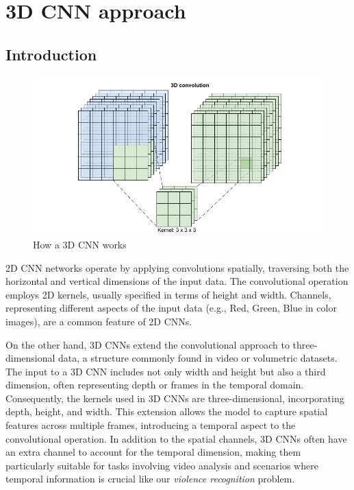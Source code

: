 \chapter{3D CNN approach}
\section{Introduction}
\begin{figure}[h]
    \centering
    \includegraphics[width=\textwidth]{./images/3DCNN.png}
    \caption{How a 3D CNN works}
    \label{fig:How3DCNNWorks}
\end{figure}

2D CNN networks operate by applying convolutions spatially, traversing both the horizontal and vertical dimensions of the input data. The convolutional operation employs 2D kernels, usually specified in terms of height and width. Channels, representing different aspects of the input data (e.g., Red, Green, Blue in color images), are a common feature of 2D CNNs.

On the other hand, 3D CNNs extend the convolutional approach to three-dimensional data, a structure commonly found in video or volumetric datasets. The input to a 3D CNN includes not only width and height but also a third dimension, often representing depth or frames in the temporal domain. Consequently, the kernels used in 3D CNNs are three-dimensional, incorporating depth, height, and width. This extension allows the model to capture spatial features across multiple frames, introducing a temporal aspect to the convolutional operation. In addition to the spatial channels, 3D CNNs often have an extra channel to account for the temporal dimension, making them particularly suitable for tasks involving video analysis and scenarios where temporal information is crucial like our \textit{violence recognition} problem.


